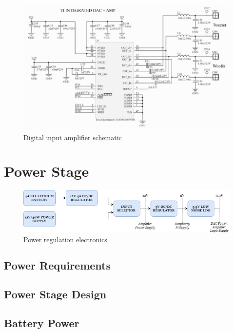 \documentclass[main.tex]{subfiles}
\begin{document}
\begin{figure}[H]
    \centering
    \includegraphics[scale=0.75]{./figs/TAS-circuit.PNG}
    \caption{Digital input amplifier schematic}
    \label{fig:tas-circuit}
\end{figure}

\section{Power Stage}

\begin{figure}[H]
    \centering
    \includegraphics[scale=0.6]{./figs/power-system.png}
    \caption{Power regulation electronics}
    \label{fig:power-system}
\end{figure}

\subsection{Power Requirements}

\subsection{Power Stage Design}

\subsection{Battery Power}
\end{document}
